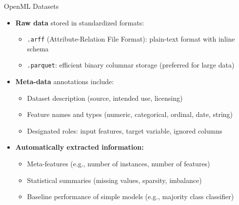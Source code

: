 \documentclass[11pt,compress,t,notes=noshow, aspectratio=169, xcolor=table]{beamer}
\begin{document}
\begin{vbframe}{OpenML Datasets}
\begin{itemize}
    \item \textbf{Raw data} stored in standardized formats:
    \begin{itemize}
        \item \texttt{.arff} (Attribute-Relation File Format): plain-text format with inline schema
        \item \texttt{.parquet}: efficient binary columnar storage (preferred for large data)
    \end{itemize}
    \item \textbf{Meta-data} annotations include:
\begin{itemize}
        \item Dataset description (source, intended use, licensing)
        \item Feature names and types (numeric, categorical, ordinal, date, string)
        \item Designated roles: input features, target variable, ignored columns
    \end{itemize}
\item \textbf{Automatically extracted information:}
    \begin{itemize}
        \item Meta-features (e.g., number of instances, number of features)
        \item Statistical summaries (missing values, sparsity, imbalance)
        \item Baseline performance of simple models (e.g., majority class classifier)
    \end{itemize}
\end{itemize}
\end{vbframe}
\end{document}
